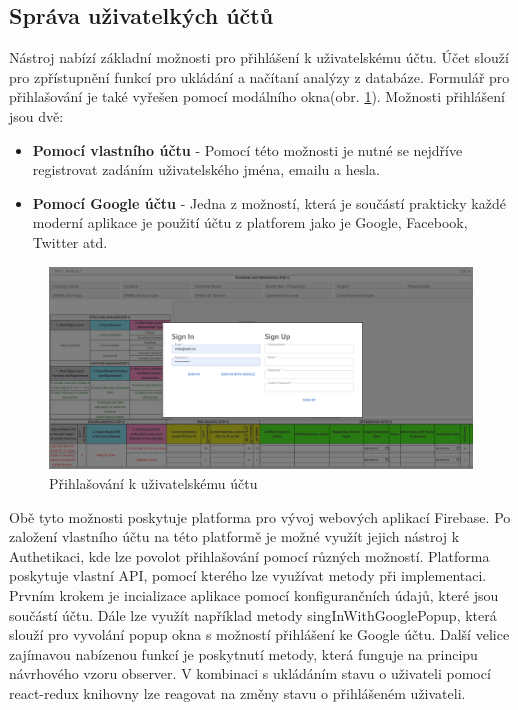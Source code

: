 \subsection{Správa uživatelkých účtů}
Nástroj nabízí základní možnosti pro přihlášení k uživatelskému účtu. Účet slouží pro zpřístupnění funkcí pro ukládání a načítaní analýzy z databáze. Formulář pro přihlašování je také vyřešen pomocí modálního okna(obr. \ref{fig:sign}). Možnosti přihlášení jsou dvě: 
\begin{itemize}
    \item \textbf{Pomocí vlastního účtu} - Pomocí této možnosti je nutné se nejdříve registrovat zadáním uživatelského jména, emailu a hesla.  
    \item \textbf{Pomocí Google účtu} - Jedna z možností, která je součástí prakticky každé moderní aplikace je použití účtu z platforem jako je Google, Facebook, Twitter atd. 
\end{itemize}

\begin{figure}[t]
\centering
	\includegraphics[width=1.0\textwidth]{Figures/sign.png}
	\caption{Přihlašování k uživatelskému účtu}
	\label{fig:sign}
\end{figure}

Obě tyto možnosti poskytuje platforma pro vývoj webových aplikací Firebase\cite{firebase}. Po založení vlastního účtu na této platformě je možné využít jejich nástroj k Authetikaci, kde lze povolot přihlašování pomocí různých možností. Platforma poskytuje vlastní API, pomocí kterého lze využívat metody při implementaci. Prvním krokem je incializace aplikace pomocí konfigurančních údajů, které jsou součástí účtu. Dále lze využít například metody singInWithGooglePopup, která slouží pro vyvolání popup okna s možností přihlášení ke Google účtu. Další velice zajímavou nabízenou funkcí je poskytnutí metody, která funguje na principu návrhového vzoru observer. V kombinaci s ukládáním stavu o uživateli pomocí react-redux knihovny lze reagovat na změny stavu o přihlášeném uživateli. 

